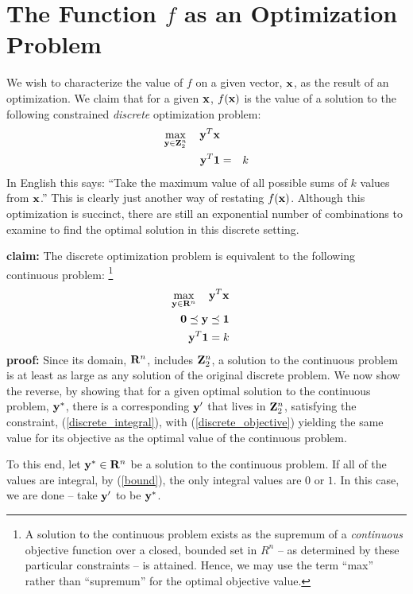 \documentclass[12pt]{article}
\begin{document}
\section{The Function $f$ as an Optimization Problem}
We wish to characterize the value of $f$ on a given vector, ${\bf x}$, as 
the result of an optimization.
We claim that for a given ${\bf x}$, $f({\bf x})$ is the value of 
a solution to the following constrained {\em discrete\/} optimization problem:%
\begin{eqnarray}
	\mathop{\rm max}_{{\bf y} \in {\bf Z}_2^n}\limits \quad {\bf y}^T {\bf x} && \label{discrete_objective} \\
{\bf y}^T {\bf 1} & = & k \label{discrete_integral} 
\end{eqnarray}
In English this says: ``Take the maximum value of all possible sums of $k$ 
values from ${\bf x}$.'' This is clearly just another way of restating $f({\bf x})$.
Although this optimization is succinct, there are still an exponential number 
of combinations to examine to find the optimal solution in this discrete setting.

{\bf claim:} The discrete optimization problem is equivalent to the following continuous problem:%
\footnote{%
A solution to the continuous problem exists as the supremum of a {\it continuous\/}
objective function over a closed, bounded set in $R^n$ -- 
as determined by these particular constraints -- is attained. Hence,
we may use the term ``max'' rather than ``supremum'' for the optimal
objective value.
}
\begin{eqnarray}
\mathop{\rm max}_{{\bf y} \in {\bf R}^n}\limits \quad {\bf y}^T {\bf x} &&  \\
{\bf 0} \preceq {\bf y}   \preceq  {\bf 1}&& \label{bound} \\ 
{\bf y}^T {\bf 1}  =  k && \label{integral} 
\end{eqnarray}
{\bf proof:}
Since its domain, ${\bf R}^n$, 
includes ${\bf Z}_2^n$, a solution to the continuous problem is at least as 
large as any solution of the original discrete problem.
We now show the reverse, by showing that for a given optimal solution to the 
continuous problem, ${\bf y}^*$, there is a corresponding ${\bf y}^\prime$ that 
lives in ${\bf Z}_2^n$, satisfying the constraint, (\ref{discrete_integral}), 
with (\ref{discrete_objective}) yielding the same value for its objective 
as the optimal value of the continuous problem.

To this end, let ${\bf y}^* \in {\bf R}^n$ be a solution to the continuous 
problem. If all of the values are integral, by (\ref{bound}), 
the only integral values are $0$ or $1$. In this case, we are done -- take 
${\bf y}^\prime$ to be ${\bf y}^*$.
\end{document}

